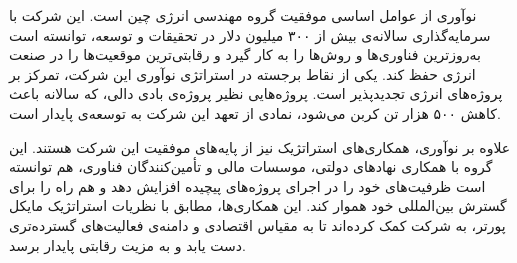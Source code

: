 \documentclass[dvipsnames, svgnames, x11names, 11pt, twocolumn]{article}
\begin{document}
نوآوری از عوامل اساسی موفقیت گروه مهندسی انرژی چین است. این شرکت با سرمایه‌گذاری سالانه‌ی بیش از ۳۰۰ میلیون دلار در تحقیقات و توسعه، توانسته است به‌روزترین فناوری‌ها و روش‌ها را به کار گیرد و رقابتی‌ترین موقعیت‌ها را در صنعت انرژی حفظ کند. یکی از نقاط برجسته در استراتژی نوآوری این شرکت، تمرکز بر پروژه‌های انرژی تجدیدپذیر است. پروژه‌هایی نظیر پروژه‌ی بادی دالی، که سالانه باعث کاهش ۵۰۰ هزار تن کربن می‌شود، نمادی از تعهد این شرکت به توسعه‌ی پایدار است.

علاوه بر نوآوری، همکاری‌های استراتژیک نیز از پایه‌های موفقیت این شرکت هستند. این گروه با همکاری نهادهای دولتی، موسسات مالی و تأمین‌کنندگان فناوری، هم توانسته است ظرفیت‌های خود را در اجرای پروژه‌های پیچیده افزایش دهد و هم راه را برای گسترش بین‌المللی خود هموار کند. این همکاری‌ها، مطابق با نظریات استراتژیک مایکل پورتر، به شرکت کمک کرده‌اند تا به مقیاس اقتصادی و دامنه‌ی فعالیت‌های گسترده‌تری دست یابد و به مزیت رقابتی پایدار برسد.
\end{document}
